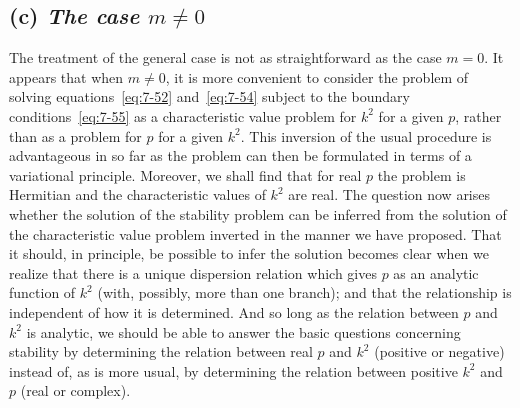 \subsection*{(c) \emph{The case $m \neq 0$}}
The treatment of the general case is not as straightforward as the
case $m = 0$.  It appears that when $m \neq 0$, it is more convenient to consider
the problem of solving equations~\eqref{eq:7-52} and~\eqref{eq:7-54} subject to the boundary
conditions~\eqref{eq:7-55} as a characteristic value problem for $k^2$ for a given $p$,
rather than as a problem for $p$ for a given $k^2$.  This inversion of the usual
procedure is advantageous in so far as the problem can then be formulated
in terms of a variational principle.  Moreover, we shall find that for real
$p$ the problem is Hermitian and the characteristic values of $k^2$ are real.
The question now arises whether the solution of the stability problem
can be inferred from the solution of the characteristic value problem
inverted in the manner we have proposed.  That it should, in principle,
be possible to infer the solution becomes clear when we realize that there
is a unique dispersion relation which gives $p$ as an analytic function of $k^2$
(with, possibly, more than one branch); and that the relationship is independent of how it is determined.  And so long as the relation between
$p$ and $k^2$ is analytic, we should be able to answer the basic questions
concerning stability by determining the relation between real $p$ and $k^2$
(positive or negative) instead of, as is more usual, by determining the
relation between positive $k^2$ and $p$ (real or complex).

